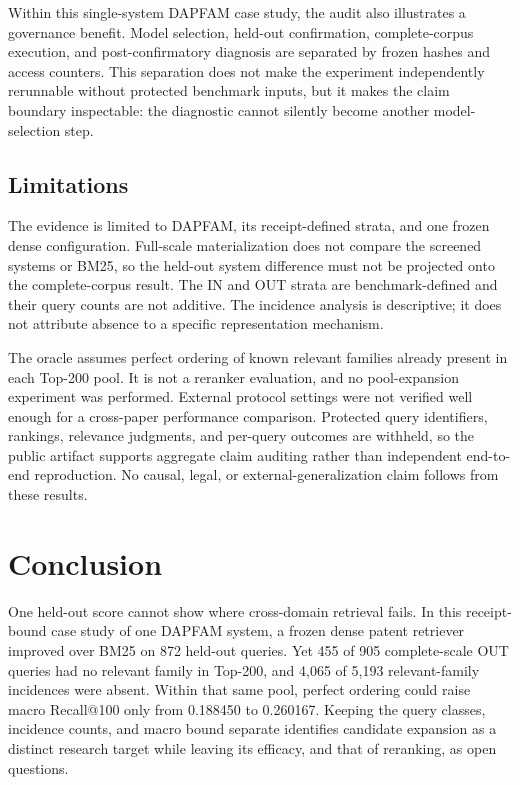 \documentclass[a4paper,conference]{IEEEtran}
\begin{document}
Within this single-system DAPFAM case study, the audit also illustrates a
governance benefit. Model selection, held-out
confirmation, complete-corpus execution, and post-confirmatory diagnosis are
separated by frozen hashes and access counters. This separation does not make
the experiment independently rerunnable without protected benchmark inputs,
but it makes the claim boundary inspectable: the diagnostic cannot silently
become another model-selection step.

\subsection{Limitations}
The evidence is limited to DAPFAM, its receipt-defined strata, and one frozen
dense configuration. Full-scale materialization does not compare the screened
systems or BM25, so the held-out system difference must not be projected onto
the complete-corpus result. The IN and OUT strata are benchmark-defined and
their query counts are not additive. The incidence analysis is descriptive;
it does not attribute absence to a specific representation mechanism.

The oracle assumes perfect ordering of known relevant families already present
in each Top-200 pool. It is not a reranker evaluation, and no pool-expansion
experiment was performed. External protocol settings were not verified well
enough for a cross-paper performance comparison. Protected query identifiers,
rankings, relevance judgments, and per-query outcomes are withheld, so the
public artifact supports aggregate claim auditing rather than independent
end-to-end reproduction. No causal, legal, or external-generalization claim
follows from these results.

\balance
\section{Conclusion}
One held-out score cannot show where cross-domain retrieval fails. In this
receipt-bound case study of one DAPFAM system, a frozen dense patent retriever
improved over BM25 on 872 held-out queries. Yet 455 of 905 complete-scale OUT
queries had no relevant family in Top-200, and 4,065 of 5,193 relevant-family
incidences were absent. Within that same pool, perfect ordering could raise
macro Recall@100 only from 0.188450 to 0.260167. Keeping the query classes,
incidence counts, and macro bound separate identifies candidate expansion as a
distinct research target while leaving its efficacy, and that of reranking, as
open questions.



\end{document}

